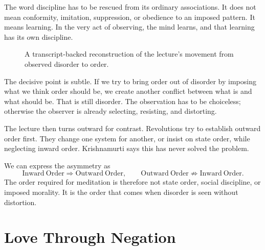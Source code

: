 The word discipline has to be rescued from its ordinary associations. It does not mean conformity, imitation, suppression, or obedience to an imposed pattern. It means learning. In the very act of observing, the mind learns, and that learning has its own discipline.

\begin{figure}
\centering
{}
\caption{A transcript-backed reconstruction of the lecture's movement from observed disorder to order.}
\end{figure}

The decisive point is subtle. If we try to bring order out of disorder by imposing what we think order should be, we create another conflict between what is and what should be. That is still disorder. The observation has to be choiceless; otherwise the observer is already selecting, resisting, and distorting.

The lecture then turns outward for contrast. Revolutions try to establish outward order first. They change one system for another, or insist on state order, while neglecting inward order. Krishnamurti says this has never solved the problem.

We can express the asymmetry as
\begin{equation}
\mathrm{Inward\ Order} \Rightarrow \mathrm{Outward\ Order},
\qquad
\mathrm{Outward\ Order} \not\Rightarrow \mathrm{Inward\ Order}.
\end{equation}
The order required for meditation is therefore not state order, social discipline, or imposed morality. It is the order that comes when disorder is seen without distortion.

\section{Love Through Negation}

